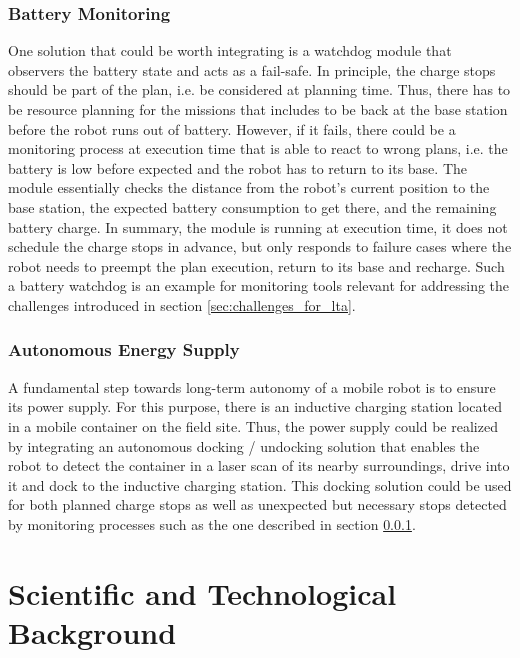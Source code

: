 \documentclass[english, master, expose, utf8]{base/thesis_KBS}
\begin{document}
\subsubsection{Battery Monitoring}
\label{sec:battery_monitoring}

One solution that could be worth integrating is a watchdog module that observers the battery state and acts as a fail-safe. In principle, the charge stops should
be part of the plan, i.e. be considered at planning time. Thus, there has to be resource planning for the missions that includes to be back at the base station before
the robot runs out of battery. However, if it fails, there could be a monitoring process at execution time that is able to react to wrong plans, i.e. the battery is
low before expected and the robot has to return to its base. The module essentially checks the distance from the robot's current position to the base station, 
the expected battery consumption to get there, and the remaining battery charge. In summary, the module is running at execution time, it does not schedule the 
charge stops in advance, but only responds to failure cases where the robot needs to preempt the plan execution, return to its base and recharge.
Such a battery watchdog is an example for monitoring tools relevant for addressing the challenges introduced in section \ref{sec:challenges_for_lta}.

\subsubsection{Autonomous Energy Supply}

A fundamental step towards long-term autonomy of a mobile robot is to ensure its power supply.
For this purpose, there is an inductive charging station located in a mobile container on the field site.
Thus, the power supply could be realized by integrating an autonomous docking / undocking solution that enables the robot to detect
the container in a laser scan of its nearby surroundings, drive into it and dock to the inductive charging station.
This docking solution could be used for both planned charge stops as well as unexpected but necessary stops detected by monitoring processes such
as the one described in section \ref{sec:battery_monitoring}.

\section{Scientific and Technological Background}
\label{sec:scientific_bg}
\end{document}
